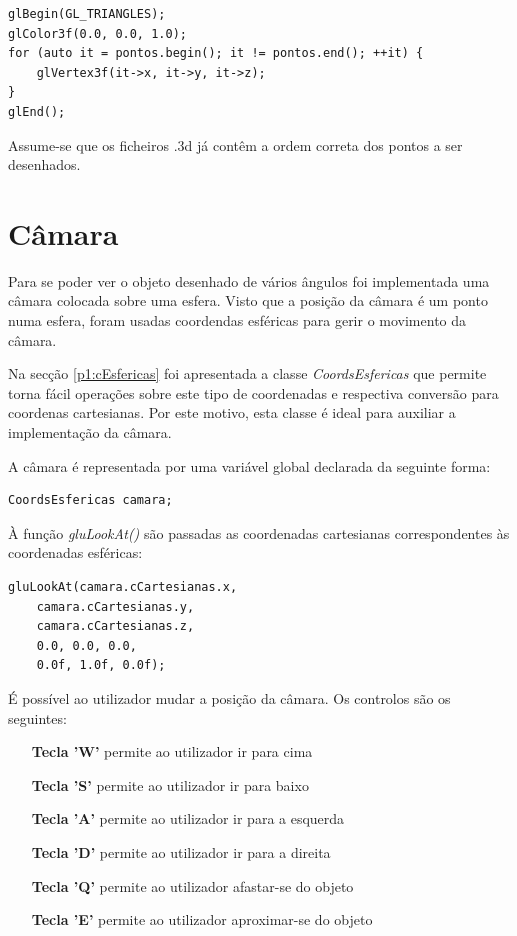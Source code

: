 \begin{Verbatim}
glBegin(GL_TRIANGLES);
glColor3f(0.0, 0.0, 1.0);
for (auto it = pontos.begin(); it != pontos.end(); ++it) {
	glVertex3f(it->x, it->y, it->z);
}
glEnd();
\end{Verbatim}

Assume-se que os ficheiros .3d já contêm a ordem correta dos pontos a ser desenhados.

\section{Câmara}

Para se poder ver o objeto desenhado de vários ângulos foi implementada uma câmara colocada sobre uma esfera. Visto que a posição da câmara é um ponto numa esfera, foram usadas coordendas esféricas para gerir o movimento da câmara.

Na secção \ref{p1:cEsfericas} foi apresentada a classe \textit{CoordsEsfericas} que permite torna fácil operações sobre este tipo de coordenadas e respectiva conversão para coordenas cartesianas. Por este motivo, esta classe é ideal para auxiliar a implementação da câmara.

A câmara é representada por uma variável global declarada da seguinte forma:

\begin{Verbatim}
CoordsEsfericas camara;
\end{Verbatim}

À função \textit{gluLookAt()} são passadas as coordenadas cartesianas correspondentes às coordenadas esféricas:

\begin{Verbatim}
gluLookAt(camara.cCartesianas.x,
	camara.cCartesianas.y,
	camara.cCartesianas.z,
	0.0, 0.0, 0.0,
	0.0f, 1.0f, 0.0f);
\end{Verbatim}

É possível ao utilizador mudar a posição da câmara. Os controlos são os seguintes:

\begin{itemize}
	\item[\textbf{Tecla 'W'}] permite ao utilizador ir para cima
	\item[\textbf{Tecla 'S'}] permite ao utilizador ir para baixo
	\item[\textbf{Tecla 'A'}] permite ao utilizador ir para a esquerda
	\item[\textbf{Tecla 'D'}] permite ao utilizador ir para a direita
	\item[\textbf{Tecla 'Q'}] permite ao utilizador afastar-se do objeto
	\item[\textbf{Tecla 'E'}] permite ao utilizador aproximar-se do objeto
\end{itemize}

